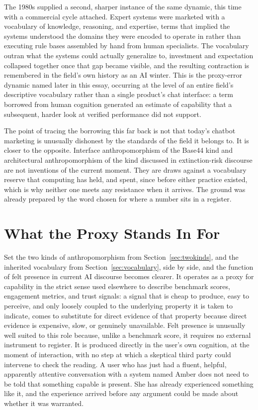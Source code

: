 \documentclass[11pt]{article}
\begin{document}
The 1980s supplied a second, sharper instance of the same dynamic, this time with a commercial cycle attached. Expert systems were marketed with a vocabulary of knowledge, reasoning, and expertise, terms that implied the systems understood the domains they were encoded to operate in rather than executing rule bases assembled by hand from human specialists. The vocabulary outran what the systems could actually generalize to, investment and expectation collapsed together once that gap became visible, and the resulting contraction is remembered in the field's own history as an AI winter\cite{crevier}. This is the proxy-error dynamic named later in this essay, occurring at the level of an entire field's descriptive vocabulary rather than a single product's chat interface: a term borrowed from human cognition generated an estimate of capability that a subsequent, harder look at verified performance did not support.

The point of tracing the borrowing this far back is not that today's chatbot marketing is unusually dishonest by the standards of the field it belongs to. It is closer to the opposite. Interface anthropomorphism of the Base44 kind and architectural anthropomorphism of the kind discussed in extinction-risk discourse are not inventions of the current moment. They are draws against a vocabulary reserve that computing has held, and spent, since before either practice existed, which is why neither one meets any resistance when it arrives. The ground was already prepared by the word chosen for where a number sits in a register.

\section{What the Proxy Stands In For}
\label{sec:proxy}

Set the two kinds of anthropomorphism from Section~\ref{sec:twokinds}, and the inherited vocabulary from Section~\ref{sec:vocabulary}, side by side, and the function of felt presence in current AI discourse becomes clearer. It operates as a proxy for capability in the strict sense used elsewhere to describe benchmark scores, engagement metrics, and trust signals: a signal that is cheap to produce, easy to perceive, and only loosely coupled to the underlying property it is taken to indicate, comes to substitute for direct evidence of that property because direct evidence is expensive, slow, or genuinely unavailable.\cite{safemode} Felt presence is unusually well suited to this role because, unlike a benchmark score, it requires no external instrument to register. It is produced directly in the user's own cognition, at the moment of interaction, with no step at which a skeptical third party could intervene to check the reading. A user who has just had a fluent, helpful, apparently attentive conversation with a system named Amber does not need to be told that something capable is present. She has already experienced something like it, and the experience arrived before any argument could be made about whether it was warranted.
\end{document}
